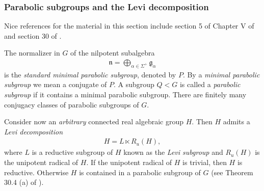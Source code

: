 \documentclass[psamsfonts]{amsart}
\theoremstyle{definition}
\theoremstyle{remark}
\numberwithin{equation}{section}
\begin{document}
\subsubsection{Parabolic subgroups and the Levi decomposition}
\label{parabolicandlevi}
Nice references for the material in this section include section 5 of Chapter V of \cite{Kn2} and section 30 of \cite{Hum}.
\par 
The normalizer in $G$ of the nilpotent subalgebra
\begin{align*}
\mathfrak{n} = \bigoplus_{\alpha \in \Sigma^{+}} \mathfrak{g}_{\alpha}
\end{align*} is the \emph{standard minimal parabolic subgroup}, denoted by $P$. By a \emph{minimal parabolic subgroup} we mean a conjugate of $P$. A subgroup $Q < G$ is called a \emph{parabolic subgroup} if it contains a minimal parabolic subgroup. There are finitely many conjugacy classes of parabolic subgroups of $G$.
\par 
Consider now an \emph{arbitrary} connected real algebraic group $H$. Then $H$ admits a \emph{Levi decomposition}
\begin{align*}
H = L \ltimes R_{u}(H),
\end{align*} where $L$ is a reductive subgroup of $H$ known as the \emph{Levi subgroup} and $R_{u}(H)$ is the unipotent radical of $H$. If the unipotent radical of $H$ is trivial, then $H$ is reductive. Otherwise $H$ is contained in a parabolic subgroup of $G$ (see Theorem 30.4 (a) of \cite{Hum}).
\end{document}
